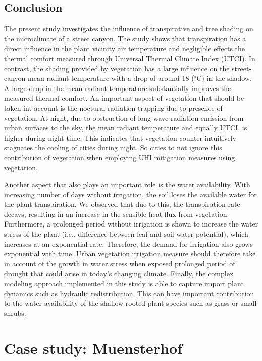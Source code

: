 \subsection{Conclusion}

The present study investigates the influence of transpirative and tree shading on the microclimate of a street canyon. The study shows that transpiration has a direct influence in the plant vicinity air temperature and negligible effects the thermal comfort measured through Universal Thermal Climate Index (UTCI). In contrast, the shading provided by vegetation has a large influence on the street-canyon mean radiant temperature with a drop of around $18$ ($^{\circ}$C) in the shadow. A large drop in the mean radiant temperature substantially improves the measured thermal comfort. An important aspect of vegetation that should be taken int account is the noctural radiation trapping due to presence of vegetation. At night, due to obstruction of long-wave radiation emission from urban surfaces to the sky, the mean radiant temperature and equally UTCI, is higher during night time. This indicates that vegetation counter-intuitively stagnates the cooling of cities during night. So cities to not ignore this contribution of vegetation when employing UHI mitigation measures using vegetation.

Another aspect that also plays an important role is the water availability. With increasing number of days without irrigation, the soil loses the available water for the plant transpiration. We observed that due to this, the transpiration rate decays, resulting in an increase in the sensible heat flux from vegetation. Furthermore, a prolonged period without irrigation is shown to increase the water stress of the plant (i.e., difference between leaf and soil water potential), which increases at an exponential rate. Therefore, the demand for irrigation also grows exponential with time. Urban vegetation irrigation measure should therefore take in account of the growth in water stress when exposed prolonged period of drought that could arise in today's changing climate. Finally, the complex modeling approach implemented in this study is able to capture import plant dynamics such as hydraulic redistribution. This can have important contribution to the water availability of the shallow-rooted plant species such as grass or small shrubs.

\section{Case study: Muensterhof}

